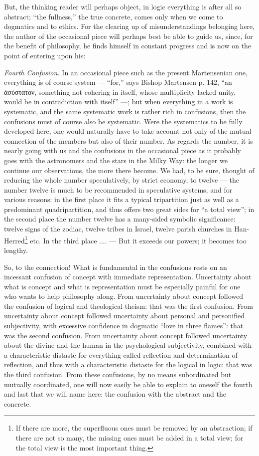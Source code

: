 \documentclass[12pt]{book}
\newcommand{\opage}[1]{\marginnote{\footnotesize\textit{[#1]}}}
\begin{document}
But, the thinking reader will perhaps object, in logic everything is after all so abstract; ``the fullness,'' the true concrete, comes only when we come to dogmatics and to ethics. For the clearing up of misunderstandings belonging here, the author of the occasional piece will perhaps best be able to guide us, since, for the benefit of philosophy, he finds himself in constant progress and is now on the point of entering upon his:

\emph{Fourth Confusion.} In an occasional piece such as the present Martensenian one, everything is of course system --- ``for,'' says Bishop Martensen p. 142, ``an ἀσύστατον, something not cohering in itself, whose multiplicity lacked unity, would be in contradiction with itself'' ---; but when everything in a work is systematic, and the same systematic work is rather rich in confusions, then the confusions must of course also be systematic. Were the systematics to be fully developed here, one would naturally have to take account not only of the mutual connection of the members but also of their number. As regards the number, it is nearly going with us and the confusions in the occasional piece as it probably goes with the astronomers and the stars in the Milky Way: the longer we continue our observations, the more there become. We had, to be sure,
\opage{127}\setcounter{footnote}{0}%
thought of reducing the whole number speculatively, by strict economy, to twelve --- the number twelve is much to be recommended in speculative systems, and for various reasons: in the first place it fits a typical tripartition just as well as a predominant quadripartition, and thus offers two great sides for ``a total view''; in the second place the number twelve has a many-sided symbolic significance: twelve signs of the zodiac, twelve tribes in Israel, twelve parish churches in Han-Herred\footnote{If there are more, the superfluous ones must be removed by an abstraction; if there are not so many, the missing ones must be added in a total view; for the total view is the most important thing.} etc. In the third place .... --- But it exceeds our powers; it becomes too lengthy.

So, to the connection! What is fundamental in the confusions rests on an incessant confusion of concept with immediate representation. Uncertainty about what is concept and what is representation must be especially painful for one who wants to help philosophy along. From uncertainty about concept followed the confusion of logical and theological theism: that was the first confusion. From uncertainty about concept followed uncertainty about personal and personified subjectivity, with excessive confidence in dogmatic ``love in three flames'': that was the second confusion. From uncertainty about concept followed uncertainty about the divine and the human in the psychological subjectivity, combined with a characteristic distaste for everything called reflection and determination of reflection, and thus with a characteristic distaste for the logical in logic: that was the third confusion. From these confusions, by no means subordinated but mutually coordinated, one will now easily be able to explain to oneself the fourth and last that we will name here: the confusion with the abstract and the concrete.
\end{document}
